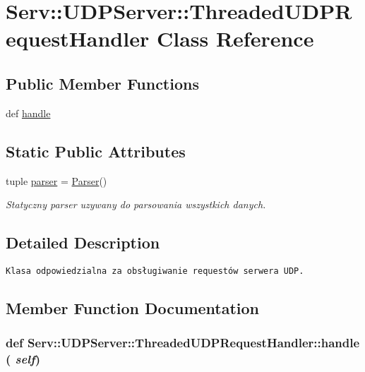 \hypertarget{class_serv_1_1_u_d_p_server_1_1_threaded_u_d_p_request_handler}{
\section{Serv::UDPServer::ThreadedUDPRequestHandler Class Reference}
\label{class_serv_1_1_u_d_p_server_1_1_threaded_u_d_p_request_handler}
}
\subsection*{Public Member Functions}
\begin{CompactItemize}
\item 
def \hyperlink{class_serv_1_1_u_d_p_server_1_1_threaded_u_d_p_request_handler_94afb499da79b188e658f8b2d4bffb9a}{handle}
\end{CompactItemize}
\subsection*{Static Public Attributes}
\begin{CompactItemize}
\item 
tuple \hyperlink{class_serv_1_1_u_d_p_server_1_1_threaded_u_d_p_request_handler_c0a5ee1efde591fb33de85283b9b4d3f}{parser} = \hyperlink{class_serv_1_1_parser_1_1_parser}{Parser}()
\begin{CompactList}\small\item\em Statyczny parser uzywany do parsowania wszystkich danych. \item\end{CompactList}\end{CompactItemize}


\subsection{Detailed Description}


\footnotesize\begin{verbatim}Klasa odpowiedzialna za obsługiwanie requestów serwera UDP.\end{verbatim}
\normalsize
 

\subsection{Member Function Documentation}
\hypertarget{class_serv_1_1_u_d_p_server_1_1_threaded_u_d_p_request_handler_94afb499da79b188e658f8b2d4bffb9a}{
\subsubsection[{handle}]{\setlength{\rightskip}{0pt plus 5cm}def Serv::UDPServer::ThreadedUDPRequestHandler::handle ( {\em self})}}
\label{class_serv_1_1_u_d_p_server_1_1_threaded_u_d_p_request_handler_94afb499da79b188e658f8b2d4bffb9a}




